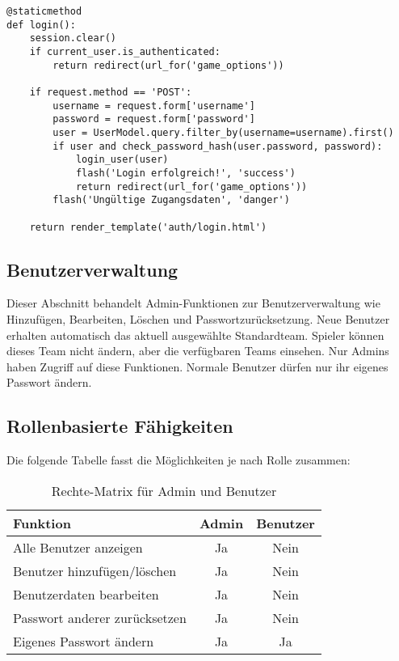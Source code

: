 \documentclass[12pt]{article}
\begin{document}
\begin{verbatim}
@staticmethod
def login():
    session.clear()
    if current_user.is_authenticated:
        return redirect(url_for('game_options'))

    if request.method == 'POST':
        username = request.form['username']
        password = request.form['password']
        user = UserModel.query.filter_by(username=username).first()
        if user and check_password_hash(user.password, password):
            login_user(user)
            flash('Login erfolgreich!', 'success')
            return redirect(url_for('game_options'))
        flash('Ungültige Zugangsdaten', 'danger')

    return render_template('auth/login.html')
\end{verbatim}

\subsection{Benutzerverwaltung}

Dieser Abschnitt behandelt Admin-Funktionen zur Benutzerverwaltung wie Hinzufügen, Bearbeiten, Löschen und Passwortzurücksetzung. Neue Benutzer erhalten automatisch das aktuell ausgewählte Standardteam. Spieler können dieses Team nicht ändern, aber die verfügbaren Teams einsehen. Nur Admins haben Zugriff auf diese Funktionen. Normale Benutzer dürfen nur ihr eigenes Passwort ändern.

\subsection{Rollenbasierte Fähigkeiten}

Die folgende Tabelle fasst die Möglichkeiten je nach Rolle zusammen:

\begin{table}[h!]
\centering
\renewcommand{\arraystretch}{1.2}
\begin{tabularx}{\textwidth}{|X|c|c|}
\hline
\textbf{Funktion} & \textbf{Admin} & \textbf{Benutzer} \\
\hline
Alle Benutzer anzeigen       & Ja & Nein \\
Benutzer hinzufügen/löschen  & Ja & Nein \\
Benutzerdaten bearbeiten     & Ja & Nein \\
Passwort anderer zurücksetzen & Ja & Nein \\
Eigenes Passwort ändern      & Ja & Ja \\
\hline
\end{tabularx}
\caption{Rechte-Matrix für Admin und Benutzer}
\end{table}
\end{document}
